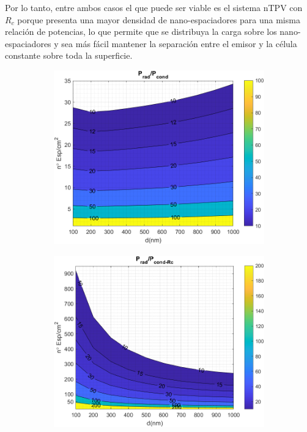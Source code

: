 Por lo tanto, entre ambos casos el que puede ser viable es el sistema nTPV con $R_c$ porque presenta una mayor densidad de nano-espaciadores para una misma relación de potencias, lo que permite que se distribuya la carga sobre los nano-espaciadores y sea más fácil mantener la separación entre el emisor y la célula constante sobre toda la superficie.
\begin{figure}[H]
		\begin{subfigure}[b]{0.49\textwidth}
		\centering
		\includegraphics[width=1.00\textwidth]{figuras/Resultados/RelacionCondRad/SiGe_full.png}
		\caption{ }
		\label{fig:rel_SiSiO2Ge_full}
	\end{subfigure}
		\hfill
		\begin{subfigure}[b]{0.49\textwidth}
			\centering
			\includegraphics[width=1.00\textwidth]{figuras/Resultados/RelacionCondRad/SiGe_Rc_full_10.png}

\end{subfigure}
\end{figure}
